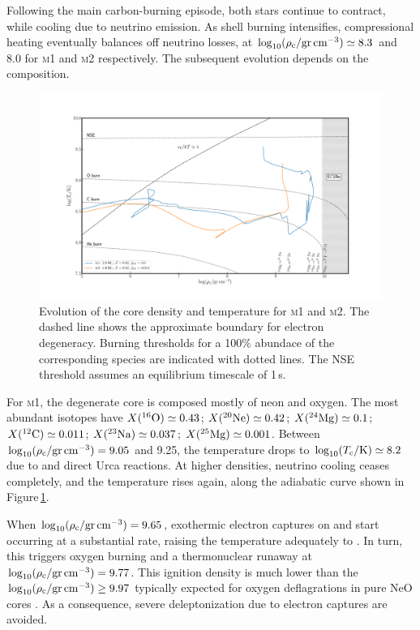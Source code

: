 \documentclass[twocolumn,tighten,times]{aastex62}
\begin{document}
Following the main carbon-burning episode, both stars continue to contract, while cooling  due to neutrino  emission. As shell burning intensifies, compressional heating eventually balances off neutrino losses, at $\logrhoc \simeq 8.3$ and 8.0 for \textsc{m1} and \textsc{m2} respectively. The subsequent evolution depends on the composition. 
\begin{figure}[htb!]
\begin{center}
\includegraphics[width=1.0\textwidth]{Rhoc_vs_Tc.pdf}
\caption{Evolution of the core density and temperature for \textsc{m1} and \textsc{m2}. The dashed line shows the approximate boundary for electron degeneracy. Burning thresholds for a 100\% abundace of the corresponding species are indicated with dotted lines. The NSE threshold assumes an equilibrium timescale of 1\,s.}
\label{fig:2}
\end{center}
\end{figure}
For \textsc{m1}, the degenerate core is composed 
mostly of neon and oxygen. The most abundant isotopes have  $\abun{O}{16}\simeq 0.43$;  $\abun{Ne}{20}\simeq 0.42$; $\abun{Mg}{24}\simeq0.1$;  $\abun{C}{12}\simeq 0.011$; $\abun{Na}{23}\simeq 0.037$; $\abun{Mg}{25}\simeq 0.001$. Between $\logrhoc=9.05$ and 9.25, the temperature drops to $\logtc\simeq 8.2$ due to  and  direct Urca reactions. At higher densities, neutrino cooling ceases completely, and the temperature rises again, along the adiabatic curve shown in Figure\,\ref{fig:2}.  

When $\logrhoc=9.65$, exothermic electron captures on  and 
 start occurring at a substantial rate, raising the temperature 
adequately to . In turn, this triggers oxygen burning and a thermonuclear runaway at  $\logrhoc= 9.77$. This ignition density is much lower than the   $\logrhoc\ge 9.97$ typically expected for oxygen deflagrations  in pure NeO cores \citep{Jones:2018ule}. As a consequence, severe deleptonization due to  electron captures are avoided. 
\end{document}
